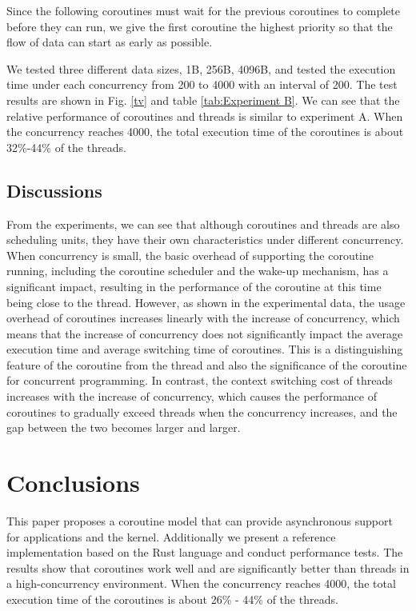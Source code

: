 \documentclass[conference]{IEEEtran}
\begin{document}
Since the following coroutines must wait for the previous coroutines to complete before they can run, we give the first coroutine the highest priority so that the flow of data can start as early as possible.

We tested three different data sizes, 1B, 256B, 4096B, and tested the execution time under each concurrency from 200 to 4000 with an interval of 200. The test results are shown in Fig. \ref{tv} and table \ref{tab:Experiment B}. We can see that the relative performance of coroutines and threads is similar to experiment A. When the concurrency reaches 4000, the total execution time of the coroutines is about 32\%-44\% of the threads.

\subsection{Discussions}

From the experiments, we can see that although coroutines and threads are also scheduling units, they have their own characteristics under different concurrency. When concurrency is small, the basic overhead of supporting the coroutine running, including the coroutine scheduler and the wake-up mechanism, has a significant impact, resulting in the performance of the coroutine at this time being close to the thread. However, as shown in the experimental data, the usage overhead of coroutines increases linearly with the increase of concurrency, which means that the increase of concurrency does not significantly impact the average execution time and average switching time of coroutines. This is a distinguishing feature of the coroutine from the thread and also the significance of the coroutine for concurrent programming. In contrast, the context switching cost of threads increases with the increase of concurrency, which causes the performance of coroutines to gradually exceed threads when the concurrency increases, and the gap between the two becomes larger and larger.

\section{Conclusions}

This paper proposes a coroutine model that can provide asynchronous support for applications and the kernel. Additionally we present a reference implementation based on the Rust language and conduct performance tests. The results show that coroutines work well and are significantly better than threads in a high-concurrency environment. When the concurrency reaches 4000, the total execution time of the coroutines is about 26\% - 44\% of the threads.





\vspace{12pt}
\end{document}
